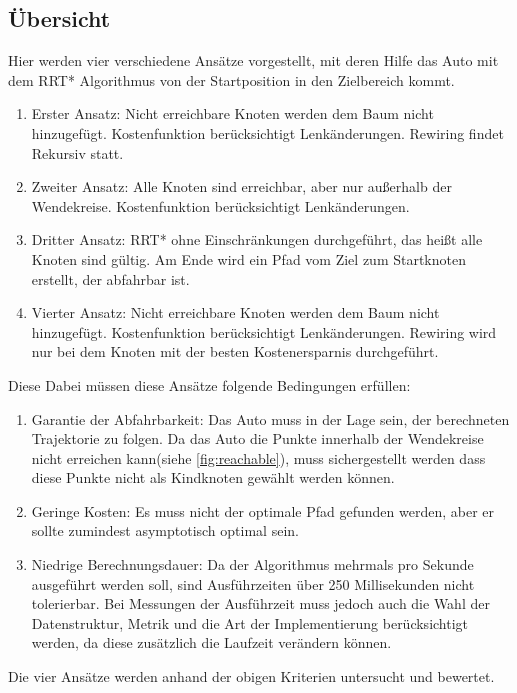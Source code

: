 \subsection{Übersicht}
Hier werden vier verschiedene Ansätze vorgestellt, mit deren Hilfe das Auto mit dem RRT* Algorithmus von der Startposition in den Zielbereich kommt.
\begin{enumerate}
\item Erster Ansatz: Nicht erreichbare Knoten werden dem Baum nicht hinzugefügt. Kostenfunktion berücksichtigt Lenkänderungen. Rewiring findet Rekursiv statt.
\item Zweiter Ansatz: Alle Knoten sind erreichbar, aber nur außerhalb der Wendekreise. Kostenfunktion berücksichtigt Lenkänderungen.
\item Dritter Ansatz: RRT* ohne Einschränkungen durchgeführt, das heißt alle Knoten sind gültig. Am Ende wird ein Pfad vom Ziel zum Startknoten erstellt, der abfahrbar ist.
\item Vierter Ansatz: Nicht erreichbare Knoten werden dem Baum nicht hinzugefügt. Kostenfunktion berücksichtigt Lenkänderungen. Rewiring wird nur bei dem Knoten mit der besten Kostenersparnis durchgeführt.
\end{enumerate}
Diese 
 Dabei müssen diese Ansätze folgende Bedingungen erfüllen: \\
\begin{enumerate}
\item Garantie der Abfahrbarkeit: Das Auto muss in der Lage sein, der berechneten Trajektorie zu folgen. Da das Auto die Punkte innerhalb der Wendekreise nicht erreichen kann(siehe \ref{fig:reachable}), muss sichergestellt werden dass diese Punkte nicht als Kindknoten gewählt werden können.
\item Geringe Kosten: Es muss nicht der optimale Pfad gefunden werden, aber er sollte zumindest asymptotisch optimal sein. 
\item Niedrige Berechnungsdauer: Da der Algorithmus mehrmals pro Sekunde ausgeführt werden soll, sind Ausführzeiten über 250 Millisekunden nicht tolerierbar. Bei Messungen der Ausführzeit muss jedoch auch die Wahl der Datenstruktur, Metrik und die Art der Implementierung berücksichtigt werden, da diese zusätzlich die Laufzeit verändern können.
\end{enumerate}
Die vier Ansätze werden anhand der obigen Kriterien untersucht und bewertet.

